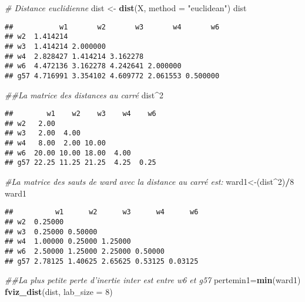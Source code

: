 \documentclass[
]{article}
\newenvironment{Shaded}{\begin{snugshade}}{\end{snugshade}}
\newcommand{\CommentTok}[1]{\textcolor[rgb]{0.56,0.35,0.01}{\textit{#1}}}
\newcommand{\DataTypeTok}[1]{\textcolor[rgb]{0.13,0.29,0.53}{#1}}
\newcommand{\DecValTok}[1]{\textcolor[rgb]{0.00,0.00,0.81}{#1}}
\newcommand{\KeywordTok}[1]{\textcolor[rgb]{0.13,0.29,0.53}{\textbf{#1}}}
\newcommand{\NormalTok}[1]{#1}
\newcommand{\OperatorTok}[1]{\textcolor[rgb]{0.81,0.36,0.00}{\textbf{#1}}}
\newcommand{\StringTok}[1]{\textcolor[rgb]{0.31,0.60,0.02}{#1}}
\begin{document}
\begin{Shaded}
\begin{Highlighting}[]
\CommentTok{# Distance euclidienne}
\NormalTok{dist <-}\StringTok{ }\KeywordTok{dist}\NormalTok{(X, }\DataTypeTok{method =} \StringTok{"euclidean"}\NormalTok{)}
\NormalTok{dist}
\end{Highlighting}
\end{Shaded}

\begin{verbatim}
##           w1       w2       w3       w4       w6
## w2  1.414214                                    
## w3  1.414214 2.000000                           
## w4  2.828427 1.414214 3.162278                  
## w6  4.472136 3.162278 4.242641 2.000000         
## g57 4.716991 3.354102 4.609772 2.061553 0.500000
\end{verbatim}

\begin{Shaded}
\begin{Highlighting}[]
\CommentTok{##La matrice des distances au carré}
\NormalTok{dist}\OperatorTok{^}\DecValTok{2}
\end{Highlighting}
\end{Shaded}

\begin{verbatim}
##        w1    w2    w3    w4    w6
## w2   2.00                        
## w3   2.00  4.00                  
## w4   8.00  2.00 10.00            
## w6  20.00 10.00 18.00  4.00      
## g57 22.25 11.25 21.25  4.25  0.25
\end{verbatim}

\begin{Shaded}
\begin{Highlighting}[]
\CommentTok{#La matrice des sauts de ward avec la distance au carré est:}
\NormalTok{ward1<-(dist}\OperatorTok{^}\DecValTok{2}\NormalTok{)}\OperatorTok{/}\DecValTok{8}
\NormalTok{ward1}
\end{Highlighting}
\end{Shaded}

\begin{verbatim}
##          w1      w2      w3      w4      w6
## w2  0.25000                                
## w3  0.25000 0.50000                        
## w4  1.00000 0.25000 1.25000                
## w6  2.50000 1.25000 2.25000 0.50000        
## g57 2.78125 1.40625 2.65625 0.53125 0.03125
\end{verbatim}

\begin{Shaded}
\begin{Highlighting}[]
\CommentTok{##La plus petite perte d'inertie inter est entre w6 et g57}
\NormalTok{pertemin1=}\KeywordTok{min}\NormalTok{(ward1)}
\KeywordTok{fviz_dist}\NormalTok{(dist, }\DataTypeTok{lab_size =} \DecValTok{8}\NormalTok{)}
\end{Highlighting}
\end{Shaded}
\end{document}
